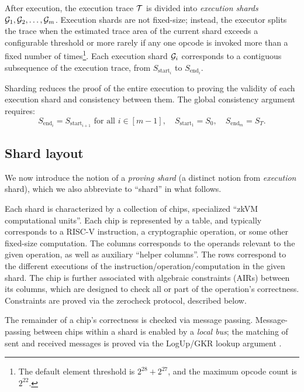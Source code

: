 \documentclass[11pt]{article}
\newcommand{\rnote}[1]{{\color{red} {Ron: #1}}}
\begin{document}
After execution, the execution trace $\mathcal{T}$ is divided into
\emph{execution shards} $\mathcal{G}_1,\mathcal{G}_2,\ldots,\mathcal{G}_m$.
Execution shards are not fixed-size; instead, the executor splits the trace when
the estimated trace area of the current shard exceeds a
configurable threshold or more rarely if any one opcode is invoked more than a fixed number of times\footnote{The default element threshold is
$2^{28}+2^{27}$, and the maximum opcode count is $2^{22}$.}.
Each execution shard $\mathcal{G}_i$ corresponds to a contiguous subsequence of the
execution trace, from $S_{\mathrm{start}_i}$ to $S_{\mathrm{end}_i}$.

Sharding reduces the proof of the entire execution to proving the
validity of each execution shard and consistency between them.
The global consistency argument requires:
$$
S_{\mathrm{end}_i} = S_{\mathrm{start}_{i+1}}\text{ for all }i\in[m-1],\quad S_{\mathrm{start}_1}=S_0,\quad S_{\mathrm{end}_m}=S_T.
$$

\subsection{Shard layout}\label{sec:core}
We now introduce the notion of a \emph{proving shard} (a distinct notion from \emph{execution} shard),
which we also abbreviate to ``shard'' in what follows.

Each shard is characterized by a collection of
chips, specialized ``zkVM computational units''.
Each chip is represented by a table, and typically corresponds to a RISC-V instruction,
a cryptographic operation, or some other fixed-size computation.
The columns corresponds to the operands relevant to the given operation, as well as auxiliary ``helper columns''.
The rows correspond to the different executions of the instruction/operation/computation in the given shard.
The chip is further associated with algebraic
constraints (AIRs) between its columns, which are designed to check all or part of the operation's
correctness. Constraints are proved via the zerocheck protocol, described below.

The remainder of a chip's correctness is checked via message passing.
Message-passing between chips within a shard is enabled by a \emph{local bus}; the matching of sent
and received messages is proved via the LogUp/GKR lookup argument \cite{DBLP:journals/iacr/PapiniH23}.
\end{document}
